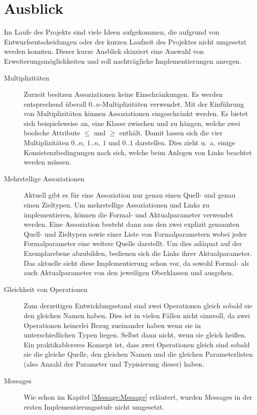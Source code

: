 \section{Ausblick}
Im Laufe des Projekts sind viele Ideen aufgekommen, die aufgrund von Entwurfsentscheidungen oder der kurzen Laufzeit des Projektes 
nicht umgesetzt werden konnten. Dieser kurze Ausblick skizziert eine Auswahl von Erweiterungsmöglichkeiten und 
soll nachträgliche Implementierungen anregen.

\begin{description}
  \item[Multiplizitäten] Zurzeit besitzen Assoziationen keine Einschränkungen. 
	Es werden entsprechend überall $0..n$-Multiplizitäten verwendet. 
	Mit der Einführung von Multiplizitäten können Assoziationen eingeschränkt werden.
	Es bietet sich beispielsweise an, eine Klasse  zwischen  und  zu hängen,
	welche zwei boolsche Attribute $\leq$ und $\geq$ enthält. Damit lassen sich die vier Multiplizitäten $0..n$, $1..n$, $1$ und $0..1$ darstellen.
	Dies zieht u.~a. einige Konsistenzbedingungen nach sich, welche beim Anlegen von Links beachtet werden müssen. 
  \item[Mehrstellige Assoziationen] Aktuell gibt es für eine Assoziation nur genau einen Quell- und genau einen Zieltypen. 
  	Um mehrstellige Assoziationen und Links zu implementieren, können die Formal- und Aktualparameter verwendet werden. 
  	Eine Assoziation besteht dann aus den zwei explizit genannten Quell- und Zieltypen sowie einer Liste von Formalparametern 
  	wobei jeder Formalparameter eine weitere Quelle darstellt. Um dies adäquat auf der Exemplarebene abzubilden, 
  	bedienen sich die Links ihrer Aktualparameter. Das aktuelle \MM sieht diese Implementierung schon vor, da sowohl 
  	Formal- als auch Aktualparameter von den jeweiligen Oberklassen  und  ausgehen.
  \item[Gleichheit von Operationen] Zum derzeitigen Entwicklungsstand sind zwei Operationen gleich sobald sie den gleichen Namen haben. Dies ist in vielen Fällen nicht
  	sinnvoll, da zwei Operationen keinerlei Bezug zueinander haben wenn sie in unterschiedlichen Typen liegen. Selbst dann nicht, wenn sie gleich heißen. 
  	Ein praktikablereres Konzept ist, dass zwei Operationen gleich sind sobald sie die gleiche Quelle, den gleichen Namen und die gleichen Parameterlisten (also Anzahl der Parameter und Typisierung dieser) haben. 
  \item[Messages] Wie schon im Kapitel \ref{Message:Message} erläutert, wurden Messages in der ersten Implementierungsstufe nicht umgesetzt. 

\end{description}
